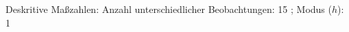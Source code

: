 				\label{tableValues:bsch19b_g2}
				\vspace*{-\baselineskip}
                    \begin{noten}
                	    \note{} Deskritive Maßzahlen:
                	    Anzahl unterschiedlicher Beobachtungen: 15%
                	    ; 
                	      Modus ($h$): 1
                     \end{noten}


